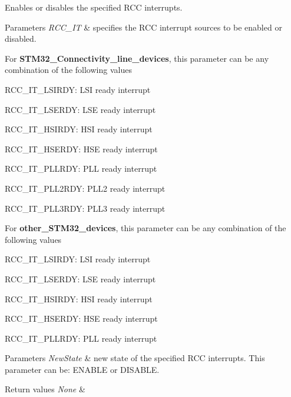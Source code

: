 Enables or disables the specified R\+CC interrupts. 


\begin{DoxyParams}{Parameters}
{\em R\+C\+C\+\_\+\+IT} & specifies the R\+CC interrupt sources to be enabled or disabled.\\
\hline
\end{DoxyParams}
For {\bfseries S\+T\+M32\+\_\+\+Connectivity\+\_\+line\+\_\+devices}, this parameter can be any combination of the following values \begin{DoxyItemize}
\item R\+C\+C\+\_\+\+I\+T\+\_\+\+L\+S\+I\+R\+DY\+: L\+SI ready interrupt \item R\+C\+C\+\_\+\+I\+T\+\_\+\+L\+S\+E\+R\+DY\+: L\+SE ready interrupt \item R\+C\+C\+\_\+\+I\+T\+\_\+\+H\+S\+I\+R\+DY\+: H\+SI ready interrupt \item R\+C\+C\+\_\+\+I\+T\+\_\+\+H\+S\+E\+R\+DY\+: H\+SE ready interrupt \item R\+C\+C\+\_\+\+I\+T\+\_\+\+P\+L\+L\+R\+DY\+: P\+LL ready interrupt \item R\+C\+C\+\_\+\+I\+T\+\_\+\+P\+L\+L2\+R\+DY\+: P\+L\+L2 ready interrupt \item R\+C\+C\+\_\+\+I\+T\+\_\+\+P\+L\+L3\+R\+DY\+: P\+L\+L3 ready interrupt\end{DoxyItemize}
For {\bfseries other\+\_\+\+S\+T\+M32\+\_\+devices}, this parameter can be any combination of the following values \begin{DoxyItemize}
\item R\+C\+C\+\_\+\+I\+T\+\_\+\+L\+S\+I\+R\+DY\+: L\+SI ready interrupt \item R\+C\+C\+\_\+\+I\+T\+\_\+\+L\+S\+E\+R\+DY\+: L\+SE ready interrupt \item R\+C\+C\+\_\+\+I\+T\+\_\+\+H\+S\+I\+R\+DY\+: H\+SI ready interrupt \item R\+C\+C\+\_\+\+I\+T\+\_\+\+H\+S\+E\+R\+DY\+: H\+SE ready interrupt \item R\+C\+C\+\_\+\+I\+T\+\_\+\+P\+L\+L\+R\+DY\+: P\+LL ready interrupt\end{DoxyItemize}

\begin{DoxyParams}{Parameters}
{\em New\+State} & new state of the specified R\+CC interrupts. This parameter can be\+: E\+N\+A\+B\+LE or D\+I\+S\+A\+B\+LE. \\
\hline
\end{DoxyParams}

\begin{DoxyRetVals}{Return values}
{\em None} & \\
\hline
\end{DoxyRetVals}


